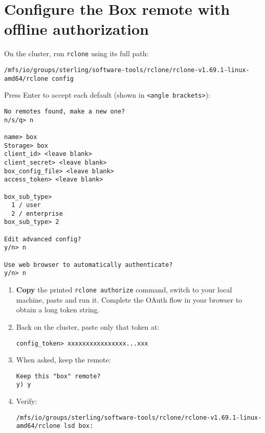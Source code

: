 \documentclass[12pt,letterpaper]{article}
\begin{document}
\section{Configure the Box remote with offline authorization}
\label{sec:configure}
On the cluster, run \texttt{rclone} using its full path:
\begin{lstlisting}[style=custombash]
/mfs/io/groups/sterling/software-tools/rclone/rclone-v1.69.1-linux-amd64/rclone config
\end{lstlisting}

Press Enter to accept each default (shown in \texttt{<angle brackets>}):
\begin{lstlisting}
No remotes found, make a new one?
n/s/q> n

name> box
Storage> box
client_id> <leave blank>
client_secret> <leave blank>
box_config_file> <leave blank>
access_token> <leave blank>

box_sub_type>
  1 / user
  2 / enterprise
box_sub_type> 2

Edit advanced config?
y/n> n

Use web browser to automatically authenticate?
y/n> n
\end{lstlisting}

\begin{enumerate}
  \item \textbf{Copy} the printed \texttt{rclone authorize} command, switch to your local machine, paste and run it. Complete the OAuth flow in your browser to obtain a long token string.
  \item Back on the cluster, paste only that token at:
    \begin{verbatim}
config_token> xxxxxxxxxxxxxxxx...xxx
    \end{verbatim}
  \item When asked, keep the remote:
    \begin{verbatim}
Keep this "box" remote?
y) y
    \end{verbatim}
  \item Verify:
    \begin{lstlisting}[style=custombash]
/mfs/io/groups/sterling/software-tools/rclone/rclone-v1.69.1-linux-amd64/rclone lsd box:
    \end{lstlisting}
\end{enumerate}
\end{document}
